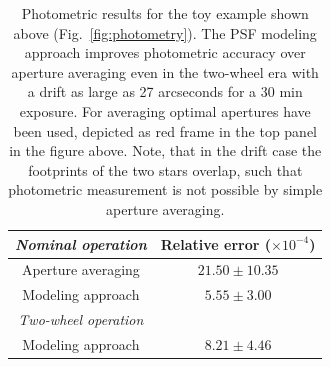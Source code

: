 \documentclass[letterpaper,12pt,whitepaper]{haastex}
\begin{document}
\begin{table}[b]
\begin{center}
\begin{tabular}{c|c}
\emph{Nominal operation} & Relative error ($\times 10^{-4}$)\\ \hline
Aperture averaging &  $21.50 \pm 10.35$ \\ 
Modeling approach  &  $5.55 \pm 3.00$ \\[5mm] 
\emph{Two-wheel operation}  & \\ \hline
Modeling approach &  $8.21 \pm 4.46$ \\
\end{tabular}
\end{center}


\caption{Photometric results for the toy example shown above
  (Fig.~\ref{fig:photometry}). The PSF modeling approach improves
  photometric accuracy over aperture averaging even in the two-wheel
  era with a drift as large as 27 arcseconds for a 30 min exposure.
  For averaging optimal apertures have been used, depicted as red
  frame in the top panel in the figure above. Note, that in the drift case the footprints of the two
  stars overlap, such that photometric measurement is not possible by
  simple aperture averaging.}

\label{tab:photometry}
\end{table}
\end{document}
